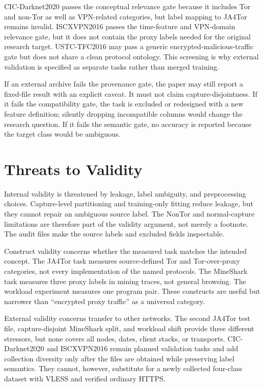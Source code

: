 \documentclass[conference]{IEEEtran}
\begin{document}
CIC-Darknet2020 passes the conceptual relevance gate because it includes Tor and non-Tor as well as VPN-related categories, but label mapping to JA4Tor remains invalid. ISCXVPN2016 passes the time-feature and VPN-domain relevance gate, but it does not contain the proxy labels needed for the original research target. USTC-TFC2016 may pass a generic encrypted-malicious-traffic gate but does not share a clean protocol ontology. This screening is why external validation is specified as separate tasks rather than merged training.

If an external archive fails the provenance gate, the paper may still report a fixed-file result with an explicit caveat. It must not claim capture-disjointness. If it fails the compatibility gate, the task is excluded or redesigned with a new feature definition; silently dropping incompatible columns would change the research question. If it fails the semantic gate, no accuracy is reported because the target class would be ambiguous.

\section{Threats to Validity}
Internal validity is threatened by leakage, label ambiguity, and preprocessing choices. Capture-level partitioning and training-only fitting reduce leakage, but they cannot repair an ambiguous source label. The NonTor and normal-capture limitations are therefore part of the validity argument, not merely a footnote. The audit files make the source labels and excluded fields inspectable.

Construct validity concerns whether the measured task matches the intended concept. The JA4Tor task measures source-defined Tor and Tor-over-proxy categories, not every implementation of the named protocols. The MineShark task measures three proxy labels in mining traces, not general browsing. The workload experiment measures one program pair. These constructs are useful but narrower than “encrypted proxy traffic” as a universal category.

External validity concerns transfer to other networks. The second JA4Tor test file, capture-disjoint MineShark split, and workload shift provide three different stressors, but none covers all nodes, dates, client stacks, or transports. CIC-Darknet2020 and ISCXVPN2016 remain planned validation tasks and add collection diversity only after the files are obtained while preserving label semantics. They cannot, however, substitute for a newly collected four-class dataset with VLESS and verified ordinary HTTPS.
\end{document}
